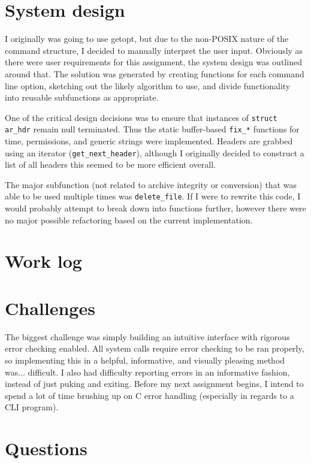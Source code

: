 \documentclass[letterpaper,10pt,titlepage]{article}
\begin{document}
\section{System design}
I originally was going to use getopt, but due to the non-POSIX nature of the command
structure, I decided to manually interpret the user input. Obviously as there were user
requirements for this assignment, the system design was outlined around that. The solution
was generated by creating functions for each command line option, sketching out the likely
algorithm to use, and divide functionality into reusable subfunctions as appropriate.

One of the critical design decisions was to ensure that instances of \verb!struct ar_hdr!
remain null terminated. Thus the static buffer-based \verb!fix_*! functions for
time, permissions, and generic strings were implemented. Headers are grabbed using
an iterator (\verb~get_next_header~), although I originally decided to construct a list
of all headers this seemed to be more efficient overall.

The major subfunction (not related to archive integrity or conversion) that was able to
be used multiple times was \verb!delete_file!. If I were to rewrite this code, I would
probably attempt to break down into functions further, however there were no major possible
refactoring based on the current implementation.

\section{Work log}


\section{Challenges}
The biggest challenge was simply building an intuitive interface with rigorous error
checking enabled. All system calls require error checking to be ran properly, so
implementing this in a helpful, informative, and visually pleasing method was... difficult.
I also had difficulty reporting errors in an informative fashion, instead of just puking
and exiting. Before my next assignment begins, I intend to spend a lot of time brushing
up on C error handling (especially in regards to a CLI program).

\section{Questions}
\end{document}
